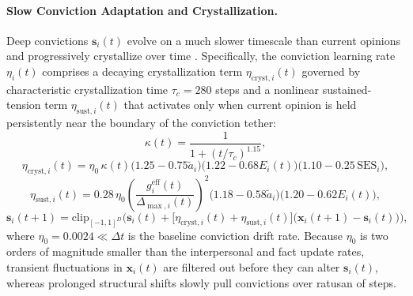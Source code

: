\paragraph{Slow Conviction Adaptation and Crystallization.}
Deep convictions $\mathbf{s}_i(t)$ evolve on a much slower timescale than current opinions and progressively crystallize over time \citep{alwin1991aging, kiley2020measuring}. Specifically, the conviction learning rate $\eta_i(t)$ comprises a decaying crystallization term $\eta_{\mathrm{cryst}, i}(t)$ governed by characteristic crystallization time $\tau_c = 280$ steps and a nonlinear sustained-tension term $\eta_{\mathrm{sust}, i}(t)$ that activates only when current opinion is held persistently near the boundary of the conviction tether:
\begin{equation}
    \kappa(t) = \frac{1}{1 + (t / \tau_c)^{1.15}},
    \label{eq:crystallization_factor}
\end{equation}
\begin{equation}
    \eta_{\mathrm{cryst}, i}(t) = \eta_0 \,\kappa(t) \big(1.25 - 0.75\tilde{a}_i\big)\big(1.22 - 0.68 E_i(t)\big)\big(1.10 - 0.25\,\mathrm{SES}_i\big),
    \label{eq:eta_cryst}
\end{equation}
\begin{equation}
    \eta_{\mathrm{sust}, i}(t) = 0.28\,\eta_0 \left(\frac{g_i^{\mathrm{eff}}(t)}{\Delta_{\max, i}(t)}\right)^2 \big(1.18 - 0.58\tilde{a}_i\big)\big(1.20 - 0.62 E_i(t)\big),
    \label{eq:eta_sustained}
\end{equation}
\begin{equation}
    \mathbf{s}_i(t+1) = \mathrm{clip}_{[-1, 1]^D}\!\Big(\mathbf{s}_i(t) + \big[\eta_{\mathrm{cryst}, i}(t) + \eta_{\mathrm{sust}, i}(t)\big]\big(\mathbf{x}_i(t+1) - \mathbf{s}_i(t)\big)\Big),
    \label{eq:conviction_update}
\end{equation}
where $\eta_0 = 0.0024 \ll \Delta t$ is the baseline conviction drift rate. Because $\eta_0$ is two orders of magnitude smaller than the interpersonal and fact update rates, transient fluctuations in $\mathbf{x}_i(t)$ are filtered out before they can alter $\mathbf{s}_i(t)$, whereas prolonged structural shifts slowly pull convictions over ratusan of steps.

